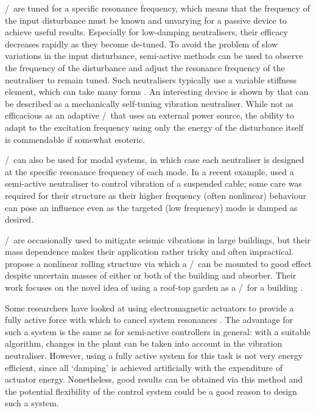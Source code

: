 \Vibneut/\ are tuned for a specific resonance frequency, which means that the
frequency of the input disturbance must be known and unvarying for a passive
device to achieve useful results. Especially for low-damping neutralisers,
their efficacy decreases rapidly as they become de-tuned. To avoid the problem
of slow variations in the input disturbance, semi-active methods can be used
to observe the frequency of the disturbance and adjust the resonance frequency
of the neutraliser to remain tuned. Such neutralisers typically use a variable
stiffness element, which can take many forms
\cite{ting-kong1999,kidner2002,holdhusen2007}. An interesting device is shown
by \cite{ivers2008} that can be described as a mechanically self-tuning
vibration neutraliser. While not as efficacious as an adaptive \vibneut/\ that
uses an external power source, the ability to adapt to the excitation
frequency using only the energy of the disturbance itself is commendable if
somewhat esoteric.

\Vibneut/\ can also be used for modal systems, in which case each
neutraliser is designed at the specific resonance frequency of each mode. In a
recent example, \textcite{casciati2007} used a semi-active neutraliser to
control vibration of a suspended cable; some care was required for their
structure as their higher frequency (often nonlinear) behaviour can pose an
influence even as the targeted (low frequency) mode is damped as desired.

\Vibneut/\ are occasionally used to mitigate seismic vibrations
in large buildings, but their mass dependence makes their application rather
tricky and often impractical. \textcite{matta2008} propose a nonlinear
rolling structure via which a \vibneut/\ can be mounted to good effect
despite uncertain masses of either or both of the building and absorber. Their
work focuses on the novel idea of using a roof-top garden as a \vibneut/\ for
a building \cite{matta2008a}.

Some researchers have looked at using electromagnetic actuators to provide a
fully active force with which to cancel system resonances
\cite{chen2005a,wu2007,kim2008a}. The advantage for such a system is the same
as for semi-active controllers in general: with a suitable algorithm, changes
in the plant can be taken into account in the vibration neutraliser. However,
using a fully active system for this task is not very energy efficient, since
all `damping' is achieved artificially with the expenditure of actuator
energy. Nonetheless, good results can be obtained via this method and the
potential flexibility of the control system could be a good reason to design
such a system.

